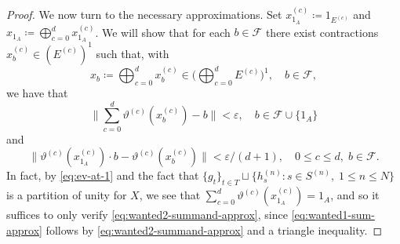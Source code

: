 \documentclass[11pt,a4paper]{amsart}
\theoremstyle{definition}
\numberwithin{equation}{section}
\newcommand{\mc}[1]{\mathcal{#1}}
\begin{document}
\begin{proof}
We now turn to the necessary approximations. Set $x_{1_A}^{(c)}\coloneqq 1_{E^{(c)}}$ and $x_{1_A}\coloneqq\bigoplus_{c=0}^dx_{1_A}^{(c)}$. We will show that for each $b\in\mc{F}$ there exist contractions $x_b^{(c)}\in (E^{(c)})^1$ such that, with
\begin{equation}\label{eq:xb}
x_b\coloneqq\bigoplus_{c=0}^dx_b^{(c)}\in \bigg(\bigoplus_{c=0}^dE^{(c)}\bigg)^1,\quad b\in\mc{F},
\end{equation}
we have that
\begin{equation}\label{eq:wanted1-sum-approx}
\bigg\|\sum_{c=0}^d\vartheta^{(c)}(x_b^{(c)})-b\bigg\|<\varepsilon,\quad b\in\mc{F}\cup\{1_A\}
\end{equation}
and
\begin{equation}\label{eq:wanted2-summand-approx}
\|\vartheta^{(c)}(x_{1_A}^{(c)})\cdot b-\vartheta^{(c)}(x_b^{(c)})\|<\varepsilon/(d+1),\quad 0\le c\le d,\; b\in\mc{F}.
\end{equation}
In fact, by \eqref{eq:ev-at-1} and the fact that $\{g_t\}_{t\in T}\sqcup\{h_s^{(n)}:s\in S^{(n)},\; 1\le n\le N\}$ is a partition of unity for $X$, we see that $\sum_{c=0}^d\vartheta^{(c)}(x_{1_A}^{(c)})=1_A$, and so it suffices to only verify \eqref{eq:wanted2-summand-approx}, since \eqref{eq:wanted1-sum-approx} follows by \eqref{eq:wanted2-summand-approx} and a triangle inequality.



\end{proof}
\end{document}

